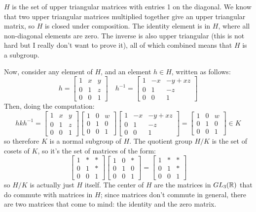 \documentclass[10pt]{article}
\begin{document}
\begin{solution}
	\( H \) is the set of upper triangular matrices with entries 1 on the diagonal. We
	know that two upper triangular matrices multiplied together give an upper triangular
	matrix, so \( H \) is closed under composition. The identity element is in \( H \),
	where all non-diagonal elements are zero. The inverse is also upper triangular 
	(this is not hard but I really don't want to prove it), all of which combined 
	means that \( H \) is a subgroup. 

	Now, consider any element of \( H \), and an element \( h \in H \), 
	written as follows:
	\[
		h = \begin{bmatrix} 1 & x & y\\0 & 1 & z\\0& 0 & 1 \end{bmatrix} \quad
		h^{-1} = \begin{bmatrix} 1 & -x & -y + xz\\0 & 1 & -z\\0 & 0 & 1 \end{bmatrix} 
	\] 
	Then, doing the computation:
	\[
		hkh^{-1} = 	\begin{bmatrix} 1 & x & y\\0 & 1 & z\\0& 0 & 1 \end{bmatrix} 
		\begin{bmatrix} 1 & 0 & w\\ 0 & 1 & 0\\0& 0& 1 \end{bmatrix} 
			\begin{bmatrix} 1 & -x & -y + xz\\0 & 1 & -z\\0 & 0 & 1 \end{bmatrix} 
			= \begin{bmatrix} 1 & 0 & w\\0 & 1 & 0 \\ 0 & 0 & 1 \end{bmatrix} \in K
	\] 
	so therefore \( K \) is a normal subgroup of \( H \). The quotient group 
	\( H / K \) is the set of cosets of \( K \), so it's the set of matrices
	of the form:
	\[
		\begin{bmatrix} 1 & * & * \\ 0 & 1 & * \\ 0 & 0 & 1 \end{bmatrix} 
		\begin{bmatrix} 1 & 0 & *\\ 0 & 1 & 0\\0 & 0 & 1 \end{bmatrix} 
		= \begin{bmatrix} 1 & * & *\\ 0 & 1 & *\\ 0 & 0 & 1 \end{bmatrix} 
	\] 
	so \( H / K \) is actually just \( H \) itself. The center of \( H \) are the 
	matrices in \( GL_3(\mathbb R) \) that do commute with matrices in \( H \); since 
	matrices don't commute in general, there are two matrices that come to mind: the 
	identity and the zero matrix.  
\end{solution}
\end{document}
